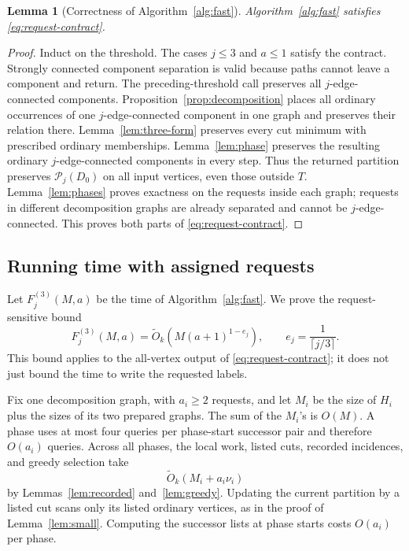 \documentclass[11pt]{article}
\newtheorem{lemma}[theorem]{Lemma}
\theoremstyle{definition}
\theoremstyle{remark}
\newcommand{\PP}{\mathcal P}
\newcommand{\OO}{\widetilde O}
\begin{document}
\begin{lemma}[Correctness of Algorithm~\ref{alg:fast}]
\label{lem:fast-correct}
Algorithm~\ref{alg:fast} satisfies \eqref{eq:request-contract}.
\end{lemma}
\begin{proof}
Induct on the threshold. The cases \(j\le3\) and \(a\le1\) satisfy the contract. Strongly connected component separation is valid because paths cannot leave a component and return. The preceding-threshold call preserves all \(j\)-edge-connected components. Proposition~\ref{prop:decomposition} places all ordinary occurrences of one \(j\)-edge-connected component in one graph and preserves their relation there. Lemma~\ref{lem:three-form} preserves every cut minimum with prescribed ordinary memberships. Lemma~\ref{lem:phase} preserves the resulting ordinary \(j\)-edge-connected components in every step. Thus the returned partition preserves \(\PP_j(D_0)\) on all input vertices, even those outside \(T\). Lemma~\ref{lem:phases} proves exactness on the requests inside each graph; requests in different decomposition graphs are already separated and cannot be \(j\)-edge-connected. This proves both parts of \eqref{eq:request-contract}.
\end{proof}

\subsection{Running time with assigned requests}
\label{sec:fast-time}
Let \(F_j^{(3)}(M,a)\) be the time of Algorithm~\ref{alg:fast}. We prove the request-sensitive bound
\begin{equation}
 F_j^{(3)}(M,a)=\OO_k\!\left(M(a+1)^{1-e_j}\right),
 \qquad e_j=\frac1{\lceil j/3\rceil}.
 \label{eq:fast-time}
\end{equation}
This bound applies to the all-vertex output of \eqref{eq:request-contract}; it does not just bound the time to write the requested labels.

Fix one decomposition graph, with \(a_i\ge2\) requests, and let \(M_i\) be the size of \(H_i\) plus the sizes of its two prepared graphs. The sum of the \(M_i\)'s is \(O(M)\). A phase uses at most four queries per phase-start successor pair and therefore \(O(a_i)\) queries. Across all phases, the local work, listed cuts, recorded incidences, and greedy selection take
\begin{equation}
 \OO_k(M_i+a_i\nu_i)
 \label{eq:fast-local-time}
\end{equation}
by Lemmas~\ref{lem:recorded} and~\ref{lem:greedy}. Updating the current partition by a listed cut scans only its listed ordinary vertices, as in the proof of Lemma~\ref{lem:small}. Computing the successor lists at phase starts costs \(O(a_i)\) per phase.
\end{document}
